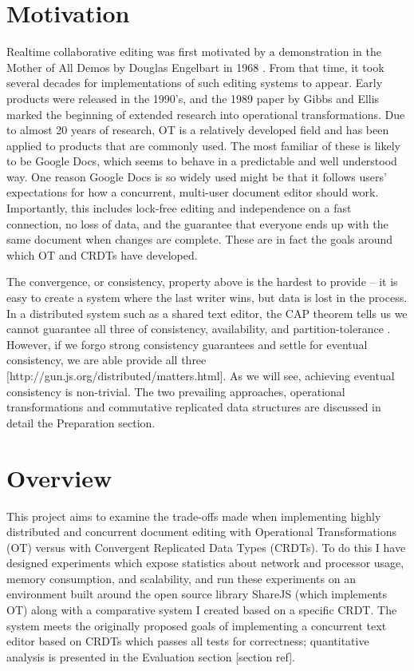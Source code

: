 \documentclass[12pt,a4paper,twoside,openright]{report}
\begin{document}
\section{Motivation}

Realtime collaborative editing was first motivated by a demonstration in the Mother of All Demos by Douglas Engelbart in 1968 \cite{MotherDemo}. From that time, it took several decades for implementations of such editing systems to appear. Early products were released in the 1990's, and the 1989 paper by Gibbs and Ellis \cite{Ellis1989} marked the beginning of extended research into operational transformations. Due to almost 20 years of research, OT is a relatively developed field and has been applied to products that are commonly used. The most familiar of these is likely to be Google Docs, which seems to behave in a predictable and well understood way. One reason Google Docs is so widely used might be that it follows users' expectations for how a concurrent, multi-user document editor should work. Importantly, this includes lock-free editing and independence on a fast connection, no loss of data, and the guarantee that everyone ends up with the same document when changes are complete. These are in fact the goals around which OT and CRDTs have developed.

The convergence, or consistency, property above is the hardest to provide – it is easy to create a system where the last writer wins, but data is lost in the process. In a distributed system such as a shared text editor, the CAP theorem tells us we cannot guarantee all three of consistency, availability, and partition-tolerance \cite{Gilbert2005}. However, if we forgo strong consistency guarantees and settle for eventual consistency, we are able provide all three [http://gun.js.org/distributed/matters.html]. As we will see, achieving eventual consistency is non-trivial. The two prevailing approaches, operational transformations and commutative replicated data structures are discussed in detail the Preparation section.


\section{Overview}
This project aims to examine the trade-offs made when implementing highly distributed and concurrent document editing with Operational Transformations (OT) versus with Convergent Replicated Data Types (CRDTs). To do this I have designed experiments which expose statistics about network and processor usage, memory consumption, and scalability, and run these experiments on an environment built around the open source library ShareJS (which implements OT) along with a comparative system I created based on a specific CRDT. The system meets the originally proposed goals of implementing a concurrent text editor based on CRDTs which passes all tests for correctness; quantitative analysis is presented in the Evaluation section [section ref].
\end{document}
